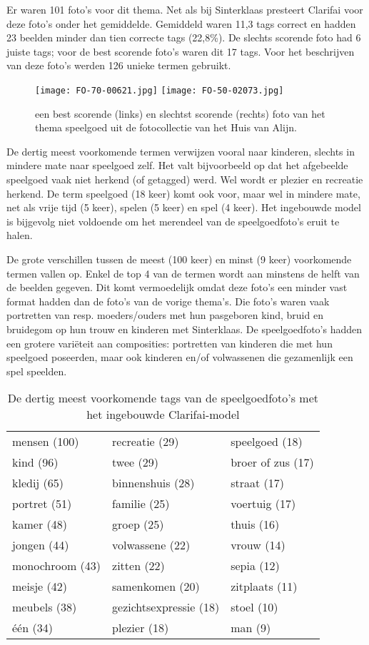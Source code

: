 Er waren 101 foto’s voor dit thema. Net als bij Sinterklaas presteert Clarifai voor deze foto’s onder het gemiddelde. Gemiddeld waren 11,3 tags correct en hadden 23 beelden minder dan tien correcte tags (22,8\%). De slechts scorende foto had 6 juiste tags; voor de best scorende foto’s waren dit 17 tags. Voor het beschrijven van deze foto’s werden 126 unieke termen gebruikt.

\begin{figure}
	\centering
	\texttt{[image: FO-70-00621.jpg]}\hfill
	\texttt{[image: FO-50-02073.jpg]}\hfill
	\caption[Best en slechtst scorende foto van thema speelgoed]{een best scorende (links) en slechtst scorende (rechts) foto van het thema speelgoed uit de fotocollectie van het Huis van Alijn.}
\end{figure}

De dertig meest voorkomende termen verwijzen vooral naar kinderen, slechts in mindere mate naar speelgoed zelf. Het valt bijvoorbeeld op dat het afgebeelde speelgoed vaak niet herkend (of getagged) werd. Wel wordt er plezier en recreatie herkend. De term speelgoed (18 keer) komt ook voor, maar wel in mindere mate, net als vrije tijd (5 keer), spelen (5 keer) en spel (4 keer). Het ingebouwde model is bijgevolg niet voldoende om het merendeel van de speelgoedfoto’s eruit te halen.

De grote verschillen tussen de meest (100 keer) en minst (9 keer) voorkomende termen vallen op. Enkel de top 4 van de termen wordt aan minstens de helft van de beelden gegeven. Dit komt vermoedelijk omdat deze foto’s een minder vast format hadden dan de foto’s van de vorige thema’s. Die foto’s waren vaak portretten van resp. moeders/ouders met hun pasgeboren kind, bruid en bruidegom op hun trouw en kinderen met Sinterklaas. De speelgoedfoto’s hadden een grotere variëteit aan composities: portretten van kinderen die met hun speelgoed poseerden, maar ook kinderen en/of volwassenen die gezamenlijk een spel speelden. 

\begin{table}
	\centering
	\begin{tabular}{*{3}{l}}
		mensen (100) & recreatie (29) & speelgoed (18) \\
		kind (96) & twee (29) & broer of zus (17) \\
		kledij (65) & binnenshuis (28) & straat (17) \\
		portret (51) & familie (25) & voertuig (17) \\
		kamer (48) & groep (25) & thuis (16) \\
		jongen (44) & volwassene (22) & vrouw (14) \\
		monochroom (43) & zitten (22) & sepia (12) \\
		meisje (42) & samenkomen (20) & zitplaats (11) \\
		meubels (38) & gezichtsexpressie (18) & stoel (10) \\
		één (34) & plezier (18) & man (9) \\
	\end{tabular}
	\caption{De dertig meest voorkomende tags van de speelgoedfoto's met het ingebouwde Clarifai-model}
	\label{tab:30-termen-speelgoed}
\end{table}

